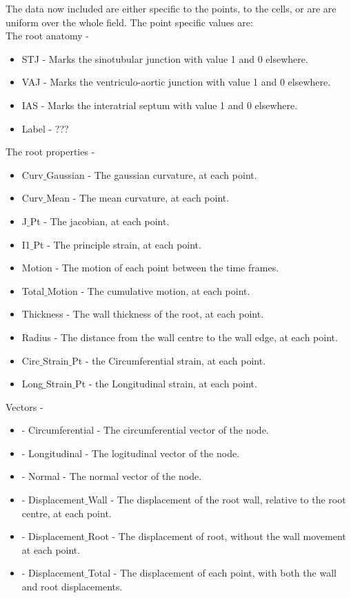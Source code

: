 \documentclass{article}
\begin{document}
The data now included are either specific to the points, to the cells, or are are uniform over the whole field.
The point specific values are:
\\
The root anatomy - 
\begin{itemize}
    \item STJ - Marks the sinotubular junction with value 1 and 0 elsewhere.
    \item VAJ - Marks the ventriculo-aortic junction with value 1 and 0 elsewhere.
    \item IAS - Marks the interatrial septum with value 1 and 0 elsewhere.
    \item Label - ???
\end{itemize}
The root properties - 
\begin{itemize}
    \item Curv$\_$Gaussian - The gaussian curvature, at each point.
    \item Curv$\_$Mean - The mean curvature, at each point.
    \item J$\_$Pt - The jacobian, at each point.
    \item I1$\_$Pt - The principle strain, at each point.
    \item Motion - The motion of each point between the time frames.
    \item Total$\_$Motion - The cumulative motion, at each point. 
    \item Thickness - The wall thickness of the root, at each point.
    \item Radius - The distance from the wall centre to the wall edge, at each point.
    \item Circ$\_$Strain$\_$Pt - the Circumferential strain, at each point.
    \item Long$\_$Strain$\_$Pt - the Longitudinal strain, at each point.
\end{itemize}
Vectors - 
\begin{itemize}
    \item - Circumferential - The circumferential vector of the node.
    \item - Longitudinal - The logitudinal vector of the node.
    \item - Normal - The normal vector of the node.
    \item - Displacement$\_$Wall - The displacement of the root wall, relative to the root centre, at each point.
    \item - Displacement$\_$Root - The displacement of root, without the wall movement at each point.
    \item - Displacement$\_$Total - The displacement of each point, with both the wall and root displacements.
\end{itemize}
\end{document}
